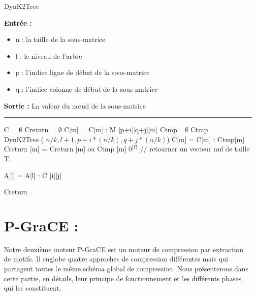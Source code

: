 \documentclass[a4paper,oneside,12pt]{report}
\theoremstyle{definition}
\begin{document}
	
					\begin{algorithm}[H]
					\label{alg:dynk2_tree}
					\caption{DynK2Tree}
					\textbf{Entrée :}
						\begin{itemize}[label=$\bullet$]
							\item n : la taille de la sous-matrice
							\item l : le niveau de l'arbre
							\item p : l'indice ligne de début de la sous-matrice
							\item q : l'indice colonne de début de la sous-matrice
						\end{itemize}
					\textbf{Sortie :} La valeur du nœud de la sous-matrice\\							\noindent\rule{\textwidth}{1pt}
						
						
				\begin{algorithmic} [1]
					\STATE C = $ \emptyset$
					\STATE Creturn  = $ \emptyset$
									\STATE C[m] = C[m] : M [p+i][q+j][m]
								\ENDFOR
							\ELSE
								\STATE Ctmp =$\emptyset$
								\STATE  Ctmp = DynK2Tree ( $n/k,l+1,p+i*(n/k), q+j*(n/k)$)
									\STATE C[m] = C[m] : Ctmp[m]
									\STATE Creturn [m] = Creturn [m] ou Ctmp [m]
								\ENDFOR
							\ENDIF
						\ENDFOR
					\ENDFOR
						\RETURN $0^{|T|}$ // retourner un vecteur nul de taille T.
					\ENDIF
					
					
					
								\STATE A[l] = A[l] : C [i][j]
							\ENDIF
						\ENDFOR
					\ENDFOR
	
					 \RETURN Creturn
					
				\end{algorithmic}
			\end{algorithm}
			
			
	
	
	
	\section{P-GraCE :}
	
	Notre deuxième moteur \gls{P-GraCE} est un moteur de compression par extraction de motifs. Il englobe quatre approches de compression différentes mais qui partagent toutes le même schéma global de compression.  Nous présenterons dans cette partie, en détails, leur principe de fonctionnement et les différents phases qui les constituent.
	
\end{document}
